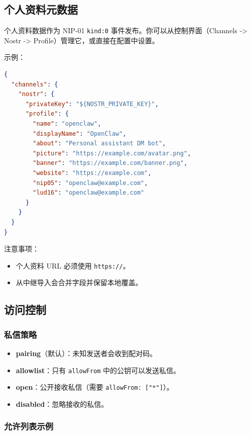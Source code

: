 \subsection{个人资料元数据}


个人资料数据作为 NIP-01 \texttt{kind:0} 事件发布。你可以从控制界面（Channels -> Nostr -> Profile）管理它，或直接在配置中设置。

示例：

\begin{lstlisting}[language=json]
{
  "channels": {
    "nostr": {
      "privateKey": "${NOSTR_PRIVATE_KEY}",
      "profile": {
        "name": "openclaw",
        "displayName": "OpenClaw",
        "about": "Personal assistant DM bot",
        "picture": "https://example.com/avatar.png",
        "banner": "https://example.com/banner.png",
        "website": "https://example.com",
        "nip05": "openclaw@example.com",
        "lud16": "openclaw@example.com"
      }
    }
  }
}
\end{lstlisting}


注意事项：

\begin{itemize}
  \item 个人资料 URL 必须使用 \texttt{https://}。
  \item 从中继导入会合并字段并保留本地覆盖。
\end{itemize}


\subsection{访问控制}


\subsubsection{私信策略}


\begin{itemize}
  \item \textbf{pairing}（默认）：未知发送者会收到配对码。
  \item \textbf{allowlist}：只有 \texttt{allowFrom} 中的公钥可以发送私信。
  \item \textbf{open}：公开接收私信（需要 \texttt{allowFrom: ["*"]}）。
  \item \textbf{disabled}：忽略接收的私信。
\end{itemize}


\subsubsection{允许列表示例}



